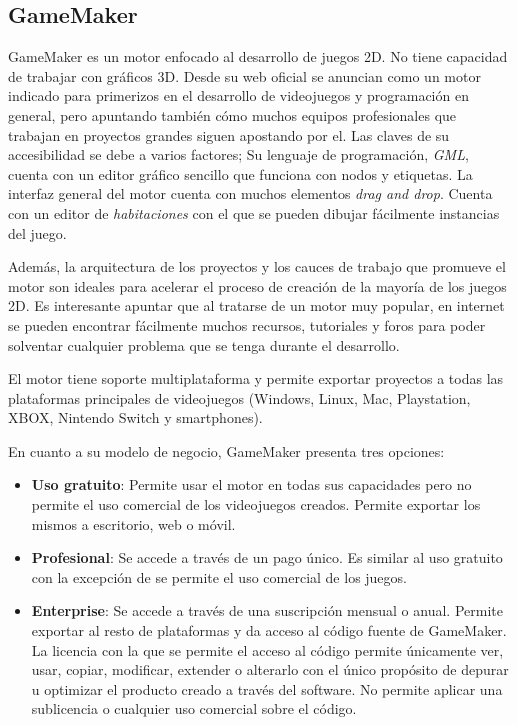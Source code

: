 \subsection{GameMaker}

GameMaker\cite{gamemaker} es un motor enfocado al desarrollo de juegos 2D. No tiene capacidad de trabajar con gráficos 3D. Desde su web oficial se anuncian como un motor indicado para primerizos en el desarrollo de videojuegos y programación en general, pero apuntando también cómo muchos equipos profesionales que trabajan en proyectos grandes siguen apostando por el. Las claves de su accesibilidad se debe a varios factores; Su lenguaje de programación, \textit{GML}, cuenta con un editor gráfico sencillo que funciona con nodos y etiquetas. La interfaz general del motor cuenta con muchos elementos \textit{drag and drop}. Cuenta con un editor de \textit{habitaciones} con el que se pueden dibujar fácilmente instancias del juego.

Además, la arquitectura de los proyectos y los cauces de trabajo que promueve el motor son ideales para acelerar el proceso de creación de la mayoría de los juegos 2D. Es interesante apuntar que al tratarse de un motor muy popular, en internet se pueden encontrar fácilmente muchos recursos, tutoriales y foros para poder solventar cualquier problema que se tenga durante el desarrollo.

El motor tiene soporte multiplataforma y permite exportar proyectos a todas las plataformas principales de videojuegos (Windows, Linux, Mac, Playstation, XBOX, Nintendo Switch y smartphones).

En cuanto a su modelo de negocio, GameMaker presenta tres opciones:

\begin{itemize}
    \item \textbf{Uso gratuito}: Permite usar el motor en todas sus capacidades pero no permite el uso comercial de los videojuegos creados. Permite exportar los mismos a escritorio, web o móvil.
    \item \textbf{Profesional}: Se accede a través de un pago único. Es similar al uso gratuito con la excepción de se permite el uso comercial de los juegos.
    \item \textbf{Enterprise}: Se accede a través de una suscripción mensual o anual. Permite exportar al resto de plataformas y da acceso al código fuente de GameMaker. La licencia con la que se permite el acceso al código permite únicamente ver, usar, copiar, modificar, extender o alterarlo con el único propósito de depurar u optimizar el producto creado a través del software. No permite aplicar una sublicencia o cualquier uso comercial sobre el código.
\end{itemize}


